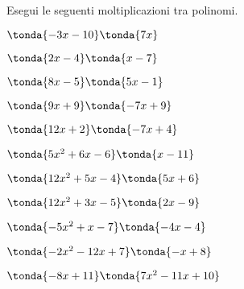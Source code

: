 \begin{esercizio}
\label{ese:10.20}
Esegui le seguenti moltiplicazioni tra polinomi.
\begin{enumeratea}
\spazielenx
\item \(\tonda{- 3 x - 10}\tonda{7 x}\)
\item \(\tonda{2 x - 4}\tonda{x - 7}\)
\item \(\tonda{8 x - 5}\tonda{5 x - 1}\)
\item \(\tonda{9 x + 9}\tonda{- 7 x + 9}\)
\item \(\tonda{12 x + 2}\tonda{- 7 x + 4}\)
\item \(\tonda{5 x^{2} + 6 x - 6}\tonda{x - 11}\)
\item \(\tonda{12 x^{2} + 5 x - 4}\tonda{5 x + 6}\)
\item \(\tonda{12 x^{2} + 3 x - 5}\tonda{2 x - 9}\)
\item \(\tonda{- 5 x^{2} + x - 7}\tonda{- 4 x - 4}\)
\item \(\tonda{- 2 x^{2} - 12 x + 7}\tonda{- x + 8}\)
\item \(\tonda{- 8 x + 11}\tonda{7 x^{2} - 11 x + 10}\) 

\end{enumeratea}
\end{esercizio}
